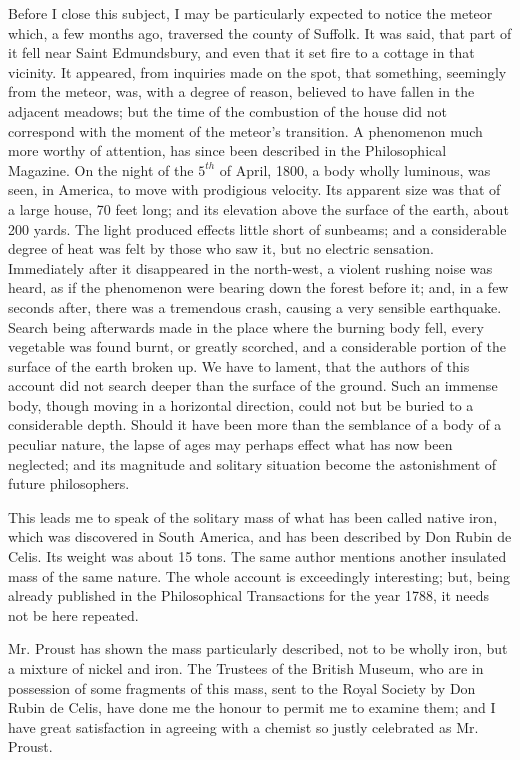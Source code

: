 \documentclass[a4paper, 12pt, oneside, twocolumn]{article}
\begin{document}
Before I close this subject, I may be particularly expected to notice the meteor which, a few months ago, traversed the county of Suffolk. It was said, that part of it fell near Saint Edmundsbury, and even that it set fire to a cottage in that vicinity. It appeared, from inquiries made on the spot, that something, seemingly from the meteor, was, with a degree of reason, believed to have fallen in the adjacent meadows; but the time of the combustion of the house did not correspond with the moment of the meteor's transition. A phenomenon much more worthy of attention, has since been described in the Philosophical Magazine. On the night of the $5^{th}$ of April, 1800, a body wholly luminous, was seen, in America, to move with prodigious velocity. Its apparent size was that of a large house, 70 feet long; and its elevation above the surface of the earth, about 200 yards. The light produced effects little short of sunbeams; and a considerable degree of heat was felt by those who saw it, but no electric sensation. Immediately after it disappeared in the north-west, a violent rushing noise was heard, as if the phenomenon were bearing down the forest before it; and, in a few seconds after, there was a tremendous crash, causing a very sensible earthquake. Search being afterwards made in the place where the burning body fell, every vegetable was found burnt, or greatly scorched, and a considerable portion of the surface of the earth broken up. We have to lament, that the authors of this account did not search deeper than the surface of the ground. Such an immense body, though moving in a horizontal direction, could not but be buried to a considerable depth. Should it have been more than the semblance of a body of a peculiar nature, the lapse of ages may perhaps effect what has now been neglected; and its magnitude and solitary situation become the astonishment of future philosophers.

This leads me to speak of the solitary mass of what has been called native iron, which was discovered in South America, and has been described by Don Rubin de Celis. Its weight was about 15 tons. The same author mentions another insulated mass of the same nature. The whole account is exceedingly interesting; but, being already published in the Philosophical Transactions for the year 1788, it needs not be here repeated.

Mr. Proust has shown the mass particularly described, not to be wholly iron, but a mixture of nickel and iron. The Trustees of the British Museum, who are in possession of some fragments of this mass, sent to the Royal Society by Don Rubin de Celis, have done me the honour to permit me to examine them; and I have great satisfaction in agreeing with a chemist so justly celebrated as Mr. Proust.
\end{document}
